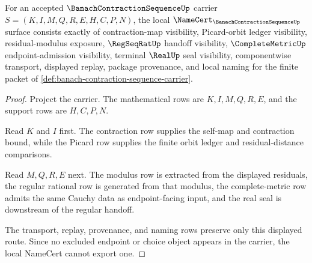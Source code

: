 \begin{theorem}
\label{thm:banach-contraction-sequence-namecert-obligations}
For an accepted $\BanachContractionSequenceUp$ carrier $S=(K,I,M,Q,R,E,H,C,P,N)$, the local $\NameCert_{\BanachContractionSequenceUp}$ surface consists exactly of contraction-map visibility, Picard-orbit ledger visibility, residual-modulus exposure, $\RegSeqRatUp$ handoff visibility, $\CompleteMetricUp$ endpoint-admission visibility, terminal $\RealUp$ seal visibility, componentwise transport, displayed replay, package provenance, and local naming for the finite packet of \autoref{def:banach-contraction-sequence-carrier}.
\end{theorem}
\begin{proof}
Project the carrier. The mathematical rows are $K,I,M,Q,R,E$, and the support rows are $H,C,P,N$.

Read $K$ and $I$ first. The contraction row supplies the self-map and contraction bound, while the Picard row supplies the finite orbit ledger and residual-distance comparisons.

Read $M,Q,R,E$ next. The modulus row is extracted from the displayed residuals, the regular rational row is generated from that modulus, the complete-metric row admits the same Cauchy data as endpoint-facing input, and the real seal is downstream of the regular handoff.

The transport, replay, provenance, and naming rows preserve only this displayed route. Since no excluded endpoint or choice object appears in the carrier, the local NameCert cannot export one.
\end{proof}


